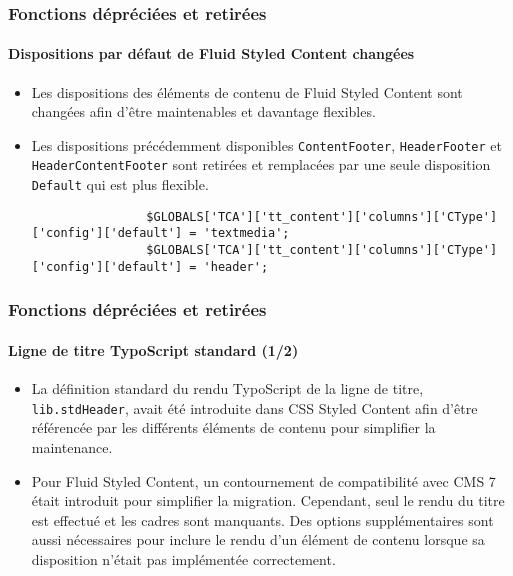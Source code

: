 \begin{frame}[fragile]
	\frametitle{Fonctions dépréciées et retirées}
	\framesubtitle{Dispositions par défaut de Fluid Styled Content changées}

	\lstset{basicstyle=\tiny\ttfamily}

	\begin{itemize}
		\item Les dispositions des éléments de contenu de Fluid Styled Content sont changées
			afin d'être maintenables et davantage flexibles.

		\item Les dispositions précédemment disponibles \texttt{ContentFooter}, \texttt{HeaderFooter}
			et \texttt{HeaderContentFooter} sont retirées et remplacées par une seule disposition
			\texttt{Default} qui est plus flexible.

			\begin{lstlisting}
				$GLOBALS['TCA']['tt_content']['columns']['CType']['config']['default'] = 'textmedia';
				$GLOBALS['TCA']['tt_content']['columns']['CType']['config']['default'] = 'header';
			\end{lstlisting}

	\end{itemize}

\end{frame}


\begin{frame}[fragile]
	\frametitle{Fonctions dépréciées et retirées}
	\framesubtitle{Ligne de titre TypoScript standard (1/2)}

	\begin{itemize}
		\item La définition standard du rendu TypoScript de la ligne de titre,
			\texttt{lib.stdHeader}, avait été introduite dans CSS Styled Content
			afin d'être référencée par les différents éléments de contenu pour
			simplifier la maintenance.

		\item Pour Fluid Styled Content, un contournement de compatibilité avec CMS 7
			était introduit pour simplifier la migration. Cependant, seul le rendu du
			titre est effectué et les cadres sont manquants. Des options supplémentaires
			sont aussi nécessaires pour inclure le rendu d'un élément de contenu lorsque
			sa disposition n'était pas implémentée correctement.

	\end{itemize}

\end{frame}

